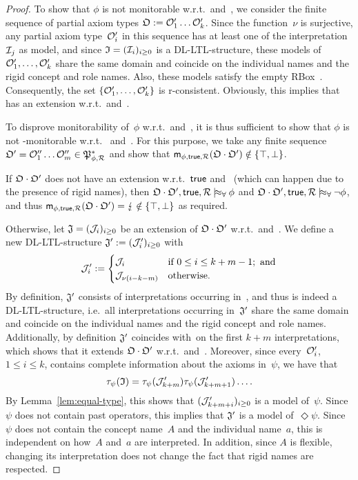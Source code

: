 \begin{proof}
    To show that $\phi$ is not monitorable w.r.t.~\true and~\Rmc, we consider
    the finite sequence of partial axiom types $\mathfrak{O}:=\mathcal{O}_1'\dots\mathcal{O}_k'$.
    Since the function~$\nu$ is surjective, any partial axiom type~$\mathcal{O}_i'$ in
    this sequence has at least one of the interpretation~$\mathcal{I}_j$ as model, and
    since $\mathfrak{I}=(\mathcal{I}_i)_{i\ge 0}$ is a DL-LTL-structure, these models of
    $\mathcal{O}_1',\dots,\mathcal{O}_k'$ share the same domain and coincide on the individual
    names and the rigid concept and role names.  Also, these models satisfy the
    empty RBox~\Rmc. Consequently, the set $\{\mathcal{O}_1',\dots,\mathcal{O}_k'\}$ is
    r-consistent.  Obviously, this implies that \Omf has an extension
    w.r.t.~\true and~\Rmc.

    To disprove monitorability of~$\phi$ w.r.t.~\true and~\Rmc, it is thus
    sufficient to show that $\phi$ is not \Omf-monitorable w.r.t.~\true
    and~\Rmc. For this purpose, we take any finite sequence
    $\mathfrak{O}'=\mathcal{O}_1''\dots\mathcal{O}_m''\in\mathfrak{P}_{\phi,\mathcal{R}}^*$ and show that
    $\mathsf{m}_{\phi,\mathsf{true},\mathcal{R}}(\mathfrak{O}\cdot\mathfrak{O}')\notin\{\top,\bot\}$.

    If $\mathfrak{O}\cdot\mathfrak{O}'$ does not have an extension w.r.t.~$\mathsf{true}$ and~\Rmc
    (which can happen due to the presence of rigid names), then
    $\Omf\cdot\Omf',\true,\Rmc\modelsal\phi$ and
    $\Omf\cdot\Omf',\true,\Rmc\modelsal\lnot\phi$, and thus
    $\mathsf{m}_{\phi,\mathsf{true},\mathcal{R}}(\mathfrak{O}\cdot\mathfrak{O}')=\lightning\notin\{\top,\bot\}$ as
    required.

    Otherwise, let $\mathfrak{J}=(\mathcal{J}_i)_{i\ge 0}$ be an extension of $\mathfrak{O}\cdot\mathfrak{O}'$
    w.r.t.~\true and~\Rmc.  We define a new DL-LTL-structure
    $\mathfrak{J}':=(\mathcal{J}_i')_{i\ge 0}$ with
    \[\Jmc_i':=\begin{cases}
            \Jmc_i            &\text{if}\ 0\le i\le k+m-1;\ \text{and}\\
            \Jmc_{\nu(i-k-m)} &\text{otherwise.}
        \end{cases}\]
    By definition, $\mathfrak{J}'$ consists of interpretations occurring in~\Jmf, and
    thus is indeed a DL-LTL-structure, i.e.~all interpretations occurring
    in~$\mathfrak{J}'$ share the same domain and coincide on the individual names and
    the rigid concept and role names.  Additionally, by definition $\mathfrak{J}'$
    coincides with~\Jmf on the first $k+m$ interpretations, which shows that it
    extends $\mathfrak{O}\cdot\mathfrak{O}'$ w.r.t.~\true and~\Rmc.  Moreover, since
    every~$\mathcal{O}_i'$, $1\le i\le k$, contains complete information about the
    axioms in~$\psi$, we have that
    \[\tau_\psi(\mathfrak{I})=\tau_\psi(\mathcal{J}_{k+m}')\tau_\psi(\mathcal{J}_{k+m+1}')\dots.\]
    By Lemma~\ref{lem:equal-type}, this shows that $(\mathcal{J}_{k+m+i}')_{i\ge 0}$
    is a model of~$\psi$.  Since $\psi$ does not contain past operators, this
    implies that $\mathfrak{J}'$ is a model of~$\Diamond\psi$.
    Since $\psi$ does not contain the concept name~$A$ and the individual
    name~$a$, this is independent on how~$A$ and~$a$ are interpreted.  In
    addition, since $A$ is flexible, changing its interpretation does not change
    the fact that rigid names are respected.


\end{proof}
